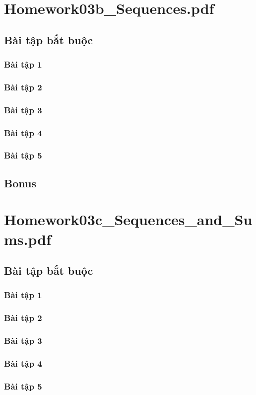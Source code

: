 \documentclass[a4paper]{article}
\begin{document}
\section{Homework03b\_Sequences.pdf}
\subsection{Bài tập bắt buộc}
\subsubsection{Bài tập 1}

\clearpage
\subsubsection{Bài tập 2}

\clearpage
\subsubsection{Bài tập 3}

\clearpage
\subsubsection{Bài tập 4}

\clearpage
\subsubsection{Bài tập 5}

\clearpage

\subsection{Bonus}
\clearpage

\section{Homework03c\_Sequences\_and\_Sums.pdf}
\subsection{Bài tập bắt buộc}
\subsubsection{Bài tập 1}

\clearpage
\subsubsection{Bài tập 2}

\clearpage
\subsubsection{Bài tập 3}

\clearpage
\subsubsection{Bài tập 4}

\clearpage
\subsubsection{Bài tập 5}

\clearpage

\clearpage
\end{document}
